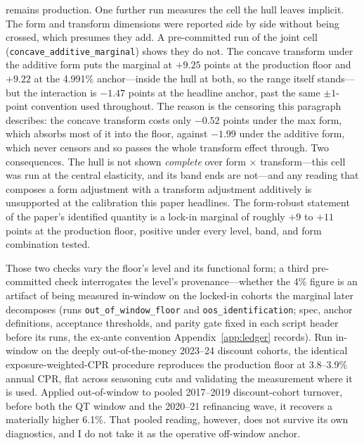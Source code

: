 \documentclass[12pt]{article}
\begin{document}
remains production. One further run measures the cell the hull leaves implicit. The form and transform dimensions were reported side by side without being crossed, which presumes they add. A pre-committed run of the joint cell (\texttt{concave\_additive\_marginal}) shows they do not. The concave transform under the additive form puts the marginal at $+9.25$ points at the production floor and $+9.22$ at the 4.991\% anchor---inside the hull at both, so the range itself stands---but the interaction is $-1.47$ points at the headline anchor, past the same $\pm 1$-point convention used throughout. The reason is the censoring this paragraph describes: the concave transform costs only $-0.52$ points under the max form, which absorbs most of it into the floor, against $-1.99$ under the additive form, which never censors and so passes the whole transform effect through. Two consequences. The hull is not shown \emph{complete} over form $\times$ transform---this cell was run at the central elasticity, and its band ends are not---and any reading that composes a form adjustment with a transform adjustment additively is unsupported at the calibration this paper headlines. The form-robust statement of the paper's identified quantity is a lock-in marginal of roughly $+9$ to $+11$ points at the production floor, positive under every level, band, and form combination tested.

Those two checks vary the floor's level and its functional form; a third pre-committed check interrogates the level's provenance---whether the 4\% figure is an artifact of being measured in-window on the locked-in cohorts the marginal later decomposes (runs \texttt{out\_of\_window\_floor} and \texttt{oos\_identification}; spec, anchor definitions, acceptance thresholds, and parity gate fixed in each script header before its runs, the ex-ante convention Appendix~\ref{app:ledger} records). Run in-window on the deeply out-of-the-money 2023--24 discount cohorts, the identical exposure-weighted-CPR procedure reproduces the production floor at 3.8--3.9\% annual CPR, flat across seasoning cuts and validating the measurement where it is used. Applied out-of-window to pooled 2017--2019 discount-cohort turnover, before both the QT window and the 2020--21 refinancing wave, it recovers a materially higher 6.1\%. That pooled reading, however, does not survive its own diagnostics, and I do not take it as the operative off-window anchor.
\end{document}
